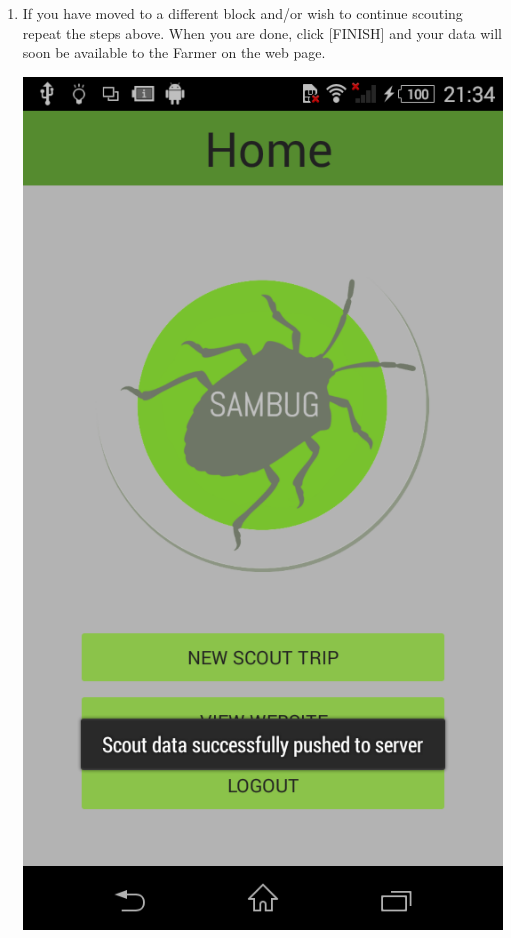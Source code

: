 \documentclass[11pt,a4paper,titlepage]{article}
\begin{document}
\begin{enumerate}
\item If you have moved to a different block and/or wish to continue scouting repeat the steps above. When you are done, click [FINISH] and your data will soon be available to the Farmer on the web page.
\begin{center}
				\includegraphics[scale=0.3]{homedatapushed}
\end{center}
\end{enumerate}
\end{document}
